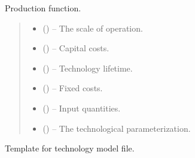 \documentclass[letterpaper,10pt,english]{sphinxmanual}
\begin{document}
\begin{fulllineitems}
\label{\detokenize{technology:technology.technology_a_model.production}}
\pysigstartsignatures
{}
\pysigstopsignatures
\sphinxAtStartPar
Production function.
\begin{quote}\begin{description}
\begin{itemize}
\item {} 
\sphinxAtStartPar
{} () – The scale of operation.

\item {} 
\sphinxAtStartPar
{} () – Capital costs.

\item {} 
\sphinxAtStartPar
{} () – Technology lifetime.

\item {} 
\sphinxAtStartPar
{} () – Fixed costs.

\item {} 
\sphinxAtStartPar
{} () – Input quantities.

\item {} 
\sphinxAtStartPar
{} () – The technological parameterization.

\end{itemize}

\end{description}\end{quote}

\end{fulllineitems}

\label{\detokenize{technology:module-technology.technology_m_model}}
\sphinxAtStartPar
Template for technology model file.
\end{document}
